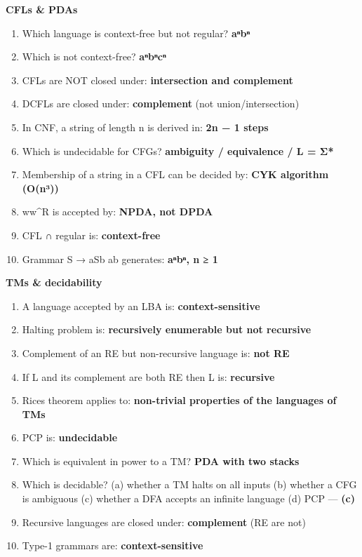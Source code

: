 \textbf{CFLs \& PDAs}

\begin{enumerate}
\def\labelenumi{\arabic{enumi}.}
\setcounter{enumi}{10}
\tightlist
\item
  Which language is context-free but not regular? \textbf{aⁿbⁿ}
\item
  Which is not context-free? \textbf{aⁿbⁿcⁿ}
\item
  CFLs are NOT closed under: \textbf{intersection and complement}
\item
  DCFLs are closed under: \textbf{complement} (not union/intersection)
\item
  In CNF, a string of length n is derived in: \textbf{2n − 1 steps}
\item
  Which is undecidable for CFGs? \textbf{ambiguity / equivalence / L = Σ*}
\item
  Membership of a string in a CFL can be decided by: \textbf{CYK algorithm (O(n³))}
\item
  ww\^{}R is accepted by: \textbf{NPDA, not DPDA}
\item
  CFL ∩ regular is: \textbf{context-free}
\item
  Grammar S → aSb \textbar{} ab generates: \textbf{aⁿbⁿ, n ≥ 1}
\end{enumerate}

\textbf{TMs \& decidability}

\begin{enumerate}
\def\labelenumi{\arabic{enumi}.}
\setcounter{enumi}{20}
\tightlist
\item
  A language accepted by an LBA is: \textbf{context-sensitive}
\item
  Halting problem is: \textbf{recursively enumerable but not recursive}
\item
  Complement of an RE but non-recursive language is: \textbf{not RE}
\item
  If L and its complement are both RE then L is: \textbf{recursive}
\item
  Rice\textquotesingle s theorem applies to: \textbf{non-trivial properties of the languages of TMs}
\item
  PCP is: \textbf{undecidable}
\item
  Which is equivalent in power to a TM? \textbf{PDA with two stacks}
\item
  Which is decidable? (a) whether a TM halts on all inputs (b) whether a CFG is ambiguous (c) whether a DFA accepts an infinite language (d) PCP --- \textbf{(c)}
\item
  Recursive languages are closed under: \textbf{complement} (RE are not)
\item
  Type-1 grammars are: \textbf{context-sensitive}
\end{enumerate}

